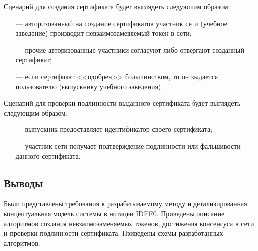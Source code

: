 Сценарий для создания сертификата будет выглядеть следующим образом:
\begin{itemize}[leftmargin=1.6\parindent]
	\item[---] авторизованный на создание сертификатов участник сети (учебное заведение) производит невзаимозаменяемый токен в сети;
	\item[---] прочие авторизованные участники согласуют либо отвергают созданный сертификат;
	\item[---] если сертификат <<одобрен>> большинством, то он выдается пользователю (выпускнику учебного заведения).
\end{itemize}

Сценарий для проверки подлинности выданного сертификата будет выглядеть следующим образом:
\begin{itemize}[leftmargin=1.6\parindent]
	\item[---] выпускник предоставляет идентификатор своего сертификата;
	\item[---] участник сети получает подтверждение подлинности или фальшивости данного сертификата.
\end{itemize}


\subsection*{Выводы}

Были представлены требования к разрабатываемому методу и детализированная концептуальная модель системы в нотации IDEF0. Приведены описание алгоритмов создания невзаимозаменяемых токенов, достижения консенсуса в сети и проверки подлинности сертификата. Приведены схемы разработанных алгоритмов.











